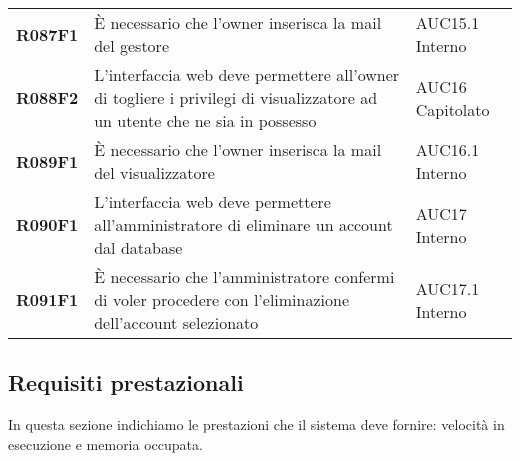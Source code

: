 \documentclass[../analisi-dei-requisiti.tex]{subfiles}
\begin{document}
\begin{longtable}[H]{>{\centering\bfseries}m{3cm} >{\centering}m{10cm} >{\centering\arraybackslash}m{3cm}}
  R087F1                               & È necessario che l'owner inserisca la mail del gestore                                                                                                                                                  & AUC15.1 Interno               \\
  R088F2                               & L'interfaccia web deve permettere all'owner di togliere i privilegi di visualizzatore ad un utente che ne sia in possesso                                                                               & AUC16 Capitolato              \\
  R089F1                               & È necessario che l'owner inserisca la mail del visualizzatore                                                                                                                                           & AUC16.1 Interno               \\
  R090F1                               & L'interfaccia web deve permettere all'amministratore di eliminare un account dal database                                                                                                               & AUC17 Interno                 \\
  R091F1                               & È necessario che l'amministratore confermi di voler procedere con l'eliminazione dell'account selezionato                                                                                               & AUC17.1 Interno               \\
\end{longtable}

\newpage
\subsection{Requisiti prestazionali}%
\label{sub:requisiti_prestazionali}
In questa sezione indichiamo le prestazioni che il sistema deve fornire: velocità in esecuzione e memoria occupata.
\end{document}
